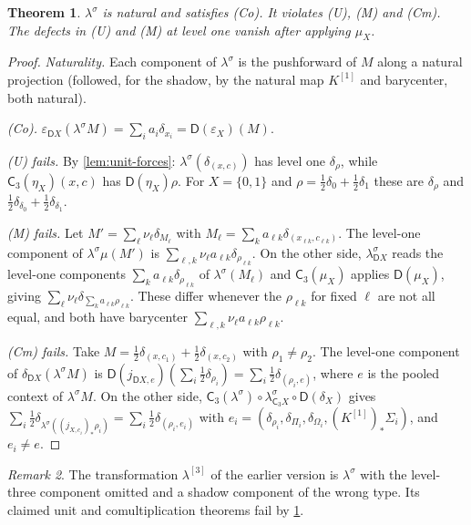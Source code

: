 \documentclass[11pt]{article}
\newtheorem{theorem}{Theorem}[section]
\theoremstyle{definition}
\theoremstyle{remark}
\newtheorem{remark}[theorem]{Remark}
\newcommand{\D}{\mathsf{D}}
\newcommand{\C}{\mathsf{C}}
\newcommand{\ls}{\lambda^{\sigma}}
\begin{document}
\begin{theorem}\label{thm:shift}
$\ls$ is natural and satisfies (Co). It violates (U), (M) and (Cm). The defects in (U) and (M) at
level one vanish after applying $\mu_X$.
\end{theorem}
\begin{proof}
\emph{Naturality.} Each component of $\ls$ is the pushforward of $M$ along a natural projection
(followed, for the shadow, by the natural map $K^{[1]}$ and barycenter, both natural).

\emph{(Co).} $\varepsilon_{\D X}(\ls M)=\sum_ia_i\delta_{x_i}=\D(\varepsilon_X)(M)$.

\emph{(U) fails.} By \cref{lem:unit-forces}: $\ls(\delta_{(x,c)})$ has level one $\delta_\rho$, while
$\C_3(\eta_X)(x,c)$ has $\D(\eta_X)\rho$. For $X=\{0,1\}$ and $\rho=\tfrac12\delta_0+\tfrac12\delta_1$
these are $\delta_\rho$ and $\tfrac12\delta_{\delta_0}+\tfrac12\delta_{\delta_1}$.

\emph{(M) fails.} Let $M'=\sum_\ell\nu_\ell\delta_{M_\ell}$ with $M_\ell=\sum_k a_{\ell k}
\delta_{(x_{\ell k},c_{\ell k})}$. The level-one component of $\ls\mu(M')$ is
$\sum_{\ell,k}\nu_\ell a_{\ell k}\delta_{\rho_{\ell k}}$. On the other side, $\ls_{\D X}$ reads the
level-one components $\sum_ka_{\ell k}\delta_{\rho_{\ell k}}$ of $\ls(M_\ell)$ and $\C_3(\mu_X)$ applies
$\D(\mu_X)$, giving $\sum_\ell\nu_\ell\delta_{\sum_ka_{\ell k}\rho_{\ell k}}$. These differ whenever the
$\rho_{\ell k}$ for fixed $\ell$ are not all equal, and both have barycenter
$\sum_{\ell,k}\nu_\ell a_{\ell k}\rho_{\ell k}$.

\emph{(Cm) fails.} Take $M=\tfrac12\delta_{(x,c_1)}+\tfrac12\delta_{(x,c_2)}$ with $\rho_1\neq\rho_2$.
The level-one component of $\delta_{\D X}(\ls M)$ is $\D(j_{\D X,e})(\sum_i\tfrac12\delta_{\rho_i})
=\sum_i\tfrac12\delta_{(\rho_i,e)}$, where $e$ is the pooled context of $\ls M$. On the other side,
$\C_3(\ls)\circ\ls_{\C_3X}\circ\D(\delta_X)$ gives $\sum_i\tfrac12\delta_{\ls((j_{X,c_i})_*\rho_i)}
=\sum_i\tfrac12\delta_{(\rho_i,e_i)}$ with $e_i=(\delta_{\rho_i},\delta_{\Pi_i},\delta_{\Omega_i},
(K^{[1]})_*\Sigma_i)$, and $e_i\ne e$.
\end{proof}

\begin{remark}
The transformation $\lambda^{[3]}$ of the earlier version is $\ls$ with the level-three component
omitted and a shadow component of the wrong type. Its claimed unit and comultiplication theorems
fail by \cref{thm:shift}.
\end{remark}
\end{document}

